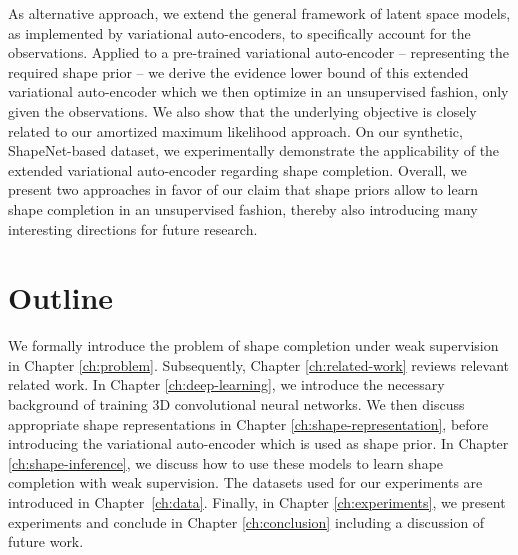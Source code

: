As alternative approach, we extend the general framework of latent space models,
as implemented by variational auto-encoders, to specifically account for the
observations. Applied to a pre-trained variational auto-encoder -- representing
the required shape prior -- we derive the evidence lower bound 
of this extended variational auto-encoder which we then
optimize in an unsupervised fashion, \ie only given the observations. We
also show that the underlying objective is closely related to
our amortized maximum likelihood approach. On our synthetic, ShapeNet-based dataset,
we experimentally demonstrate the applicability of the extended
variational auto-encoder regarding shape completion. Overall, we present two
approaches in favor of our claim that shape priors allow to learn shape completion
in an unsupervised fashion, thereby also introducing many interesting directions
for future research.

\section{Outline}

We formally introduce the problem of shape completion
under weak supervision in Chapter \ref{ch:problem}. Subsequently, Chapter
\ref{ch:related-work} reviews relevant related work. In Chapter \ref{ch:deep-learning},
we introduce the necessary background of training 3D convolutional neural networks.
We then discuss appropriate shape representations in Chapter 
\ref{ch:shape-representation}, before introducing the variational auto-encoder
which is used as shape prior. In Chapter \ref{ch:shape-inference},
we discuss how to use these models to learn shape completion with weak supervision.
The datasets used for our experiments are introduced in Chapter~\ref{ch:data}.
Finally, in Chapter \ref{ch:experiments},
we present experiments and conclude in Chapter \ref{ch:conclusion} including a
discussion of future work.
